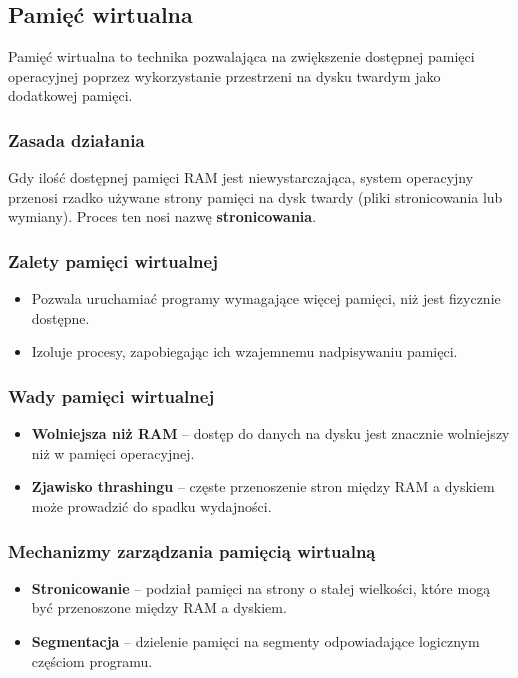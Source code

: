 \subsection{Pamięć wirtualna}
Pamięć wirtualna to technika pozwalająca na zwiększenie dostępnej pamięci operacyjnej poprzez wykorzystanie przestrzeni na dysku twardym jako dodatkowej pamięci.

\subsubsection{Zasada działania}
Gdy ilość dostępnej pamięci RAM jest niewystarczająca, system operacyjny przenosi rzadko używane strony pamięci na dysk twardy (pliki stronicowania lub wymiany). Proces ten nosi nazwę \textbf{stronicowania}.

\subsubsection{Zalety pamięci wirtualnej}
\begin{itemize}
    \item Pozwala uruchamiać programy wymagające więcej pamięci, niż jest fizycznie dostępne.
    \item Izoluje procesy, zapobiegając ich wzajemnemu nadpisywaniu pamięci.
\end{itemize}

\subsubsection{Wady pamięci wirtualnej}
\begin{itemize}
    \item \textbf{Wolniejsza niż RAM} – dostęp do danych na dysku jest znacznie wolniejszy niż w pamięci operacyjnej.
    \item \textbf{Zjawisko thrashingu} – częste przenoszenie stron między RAM a dyskiem może prowadzić do spadku wydajności.
\end{itemize}

\subsubsection{Mechanizmy zarządzania pamięcią wirtualną}
\begin{itemize}
    \item \textbf{Stronicowanie} – podział pamięci na strony o stałej wielkości, które mogą być przenoszone między RAM a dyskiem.
    \item \textbf{Segmentacja} – dzielenie pamięci na segmenty odpowiadające logicznym częściom programu.
\end{itemize}


